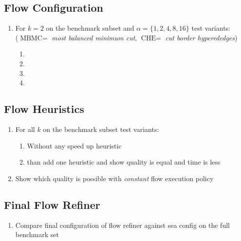 \subsection{Flow Configuration}

\begin{enumerate}
\item For $k = 2$ on the benchmark subset and $\alpha = \{1,2,4,8,16\}$ test variants:\\
($\text{MBMC} = $ \emph{most balanced minimum cut}, $\text{CHE} = $ \emph{cut border hyperededges})
\begin{enumerate}
\item \FlowVariant{+}{-}{-}{-}
\item \FlowVariant{+}{+}{-}{-}
\item \FlowVariant{+}{+}{+}{-}
\item \FlowVariant{+}{+}{+}{+}
\end{enumerate}
\end{enumerate}

\subsection{Flow Heuristics}

\begin{enumerate}
\item For all $k$ on the benchmark subset test variants:
\begin{enumerate}
\item Without any speed up heuristic
\item than add one heuristic and show quality is equal and time is less
\end{enumerate}
\item Show which quality is possible with \emph{constant} flow execution policy
\end{enumerate}

\subsection{Final Flow Refiner}

\begin{enumerate}
\item Compare final configuration of flow refiner against sea config on the full benchmark set
\end{enumerate}



